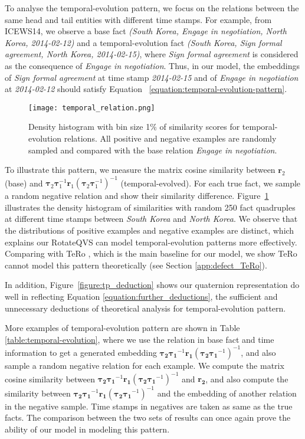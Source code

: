 \documentclass[11pt]{article}
\newcommand{\exam}[1]{\emph{#1}\xspace}
\newcommand{\vect}[1]{\mathbf{#1}\xspace}
\begin{document}
To analyse the temporal-evolution pattern, we focus on the relations between the same head and tail entities with different time stamps.
For example, from ICEWS14, we observe a base fact \textit{(South Korea, Engage in negotiation, North Korea, 2014-02-12)} and a temporal-evolution fact \textit{(South Korea, Sign formal agreement, North Korea, 2014-02-15)}, where \exam{Sign formal agreement} is considered as the consequence of \exam{Engage in negotiation}.
Thus, in our model, the embeddings of \textit{Sign formal agreement} at time stamp \textit{2014-02-15} and of \textit{Engage in negotiation} at \textit{2014-02-12} should satisfy Equation~ \ref{equation:temporal-evolution-pattern}.


\begin{figure}[!t]
\centering
\texttt{[image: temporal\_relation.png]} 
\caption{Density histogram with bin size 1\% of similarity scores for temporal-evolution relations. All positive and negative examples are randomly sampled and compared with the base relation \exam{Engage in negotiation}.}
\label{figure:temporal_examples}
\end{figure}

To illustrate this pattern, we measure the matrix cosine similarity between $\vect{r}_2$ (base) and $\pmb{\tau}_2 \pmb{\tau}_1^{-1} \vect{r}_1 (\pmb{\tau}_2 \pmb{\tau}_1^{-1})^{-1}$ (temporal-evolved).
For each true fact, we sample a random negative relation and show their similarity difference.
Figure~\ref{figure:temporal_examples} illustrates the density histogram of similarities with random 250 fact quadruples at different time stamps between \textit{South Korea} and \textit{North Korea}.
We observe that the distributions of positive examples and negative examples are distinct, which explains our RotateQVS can model temporal-evolution patterns more effectively.
Comparing with TeRo \cite{xu2020tero}, which is the main baseline for our model, we show TeRo cannot model this pattern theoretically (see Section \ref{app:defect_TeRo}).

In addition, Figure~\ref{figure:tp_deduction} shows our quaternion representation do well in reflecting Equation \ref{equation:further_deductions}, the sufficient and unnecessary deductions of theoretical analysis for temporal-evolution pattern.

More examples of temporal-evolution pattern are shown in Table~ \ref{table:temporal-evolution}, where we use the relation in base fact and time information to get a generated embedding $\pmb{\tau_2} \pmb{\tau_1}^{-1} \vect{r_1} (\pmb{\tau_2} \pmb{\tau_1}^{-1})^{-1}$, and also sample a random negative relation for each example.
We compute the matrix cosine similarity between $\pmb{\tau_2} \pmb{\tau_1}^{-1} \vect{r_1} (\pmb{\tau_2} \pmb{\tau_1}^{-1})^{-1}$ and $\vect{r_2}$, and also compute the similarity between $\pmb{\tau_2} \pmb{\tau_1}^{-1} \vect{r_1} (\pmb{\tau_2} \pmb{\tau_1}^{-1})^{-1}$ and the embedding of another relation in the negative sample.
Time stamps in negatives are taken as same as the true facts.
The comparison between the two sets of results can once again prove the ability of our model in modeling this pattern.
\end{document}
